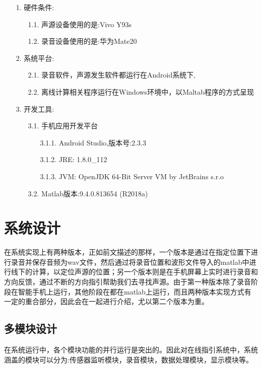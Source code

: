 \documentclass[winfonts,oneside]{njuthesis}
\begin{document}
		\begin{enumerate}
			\item[1.] 硬件条件:
				\begin{enumerate}
					\item[1.1.] 声源设备使用的是:Vivo Y93s
					\item[1.2.] 录音设备使用的是:华为Mate20
				\end{enumerate}
			\item[2.] 系统平台:
				\begin{enumerate}
					\item[2.1.] 录音软件，声源发生软件都运行在Android系统下,
					\item[2.2.] 离线计算相关程序运行在Windows环境中，以Maltab程序的方式呈现	
				\end{enumerate}
			\item[3.] 开发工具:
				\begin{enumerate}
					\item[3.1.] 手机应用开发平台
						\begin{enumerate}
							\item[3.1.1.] Android Studio,版本号:2.3.3
							\item[3.1.2.] JRE: 1.8.0\_112
							\item[3.1.3.] JVM: OpenJDK 64-Bit Server VM by JetBrains s.r.o		
						\end{enumerate}			
					\item[3.2.] Matlab版本:9.4.0.813654 (R2018a)
				\end{enumerate}	
		\end{enumerate}
	
	\section{系统设计}
	
		在系统实现上有两种版本，正如前文描述的那样，一个版本是通过在指定位置下进行录音并保存音频为wav文件，然后通过将录音位置和波形文件导入的matlab中进行线下的计算，以定位声源的位置；另一个版本则是在手机屏幕上实时进行录音和方向反馈，通过不断的方向指引帮助我们去寻找声源。由于第一种版本除了录音阶段在智能手机上运行，其他阶段在都在matlab上运行，而且两种版本实现方式有一定的重合部分，因此会在一起进行介绍，尤以第二个版本为重。
		
		\subsection{多模块设计}
		
			在系统运行中，各个模块功能的并行运行是突出的。因此对在线指引系统中，系统涵盖的模块可以分为:传感器监听模块，录音模块，数据处理模块，显示模块等。
			
\end{document}
